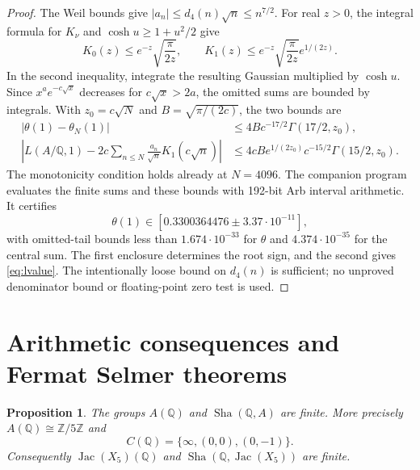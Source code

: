 \documentclass[11pt]{article}
\newcommand{\Q}{\mathbb Q}
\newcommand{\Z}{\mathbb Z}
\numberwithin{equation}{section}
\newcommand{\Sha}{\operatorname{Sha}}
\newcommand{\Jac}{\operatorname{Jac}}
\newtheorem{proposition}[theorem]{Proposition}
\theoremstyle{definition}
\begin{document}
\begin{proof}
The Weil bounds give $|a_n|\leq d_4(n)\sqrt n\leq n^{7/2}$.
For real $z>0$, the integral formula for $K_\nu$ and
$\cosh u\geq1+u^2/2$ give
\begin{equation}
K_0(z)\leq e^{-z}\sqrt{\frac\pi{2z}},\qquad
K_1(z)\leq e^{-z}\sqrt{\frac\pi{2z}}e^{1/(2z)}.
\label{eq:kbound}
\end{equation}
In the second inequality, integrate the resulting Gaussian multiplied
by $\cosh u$. Since $x^a e^{-c\sqrt x}$ decreases for
$c\sqrt x>2a$, the omitted sums are bounded by integrals. With
$z_0=c\sqrt N$ and $B=\sqrt{\pi/(2c)}$, the two bounds are
\begin{align*}
|\theta(1)-\theta_N(1)|
&\leq4B c^{-17/2}\Gamma(17/2,z_0),\\
\left|L(A/\Q,1)-2c\sum_{n\leq N}\frac{a_n}{\sqrt n}K_1(c\sqrt n)\right|
&\leq4cB e^{1/(2z_0)}c^{-15/2}\Gamma(15/2,z_0).
\end{align*}
The monotonicity condition holds already at $N=4096$.
The companion program evaluates the finite sums and these bounds with
192-bit Arb interval arithmetic. It certifies
\[
\theta(1)\in[0.3300364476\mathbin\pm3.37\cdot10^{-11}],
\]
with omitted-tail bounds less than $1.674\cdot10^{-33}$ for $\theta$
and $4.374\cdot10^{-35}$ for the central sum. The first enclosure
determines the root sign, and the second gives \eqref{eq:lvalue}.
The intentionally loose bound on $d_4(n)$ is sufficient; no unproved
denominator bound or floating-point zero test is used.
\end{proof}



\section{Arithmetic consequences and Fermat Selmer theorems}

\begin{proposition}\label{prop:arithmetic}
The groups $A(\Q)$ and $\Sha(\Q,A)$ are finite. More precisely
$A(\Q)\cong\Z/5\Z$ and
\begin{equation}
C(\Q)=\{\infty,(0,0),(0,-1)\}.
\label{eq:cpoints}
\end{equation}
Consequently $\Jac(X_5)(\Q)$ and $\Sha(\Q,\Jac(X_5))$ are finite.
\end{proposition}
\end{document}
